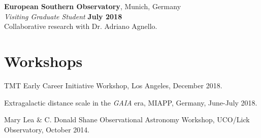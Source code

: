 \documentclass[margin, line]{res}
\newenvironment{list2}{
  \begin{list}{$\bullet$}{%
      \setlength{\itemsep}{0in}
      \setlength{\parsep}{0in} \setlength{\parskip}{0in}
      \setlength{\topsep}{0in} \setlength{\partopsep}{0in} 
      \setlength{\leftmargin}{0.2in}}}{\end{list}}
\begin{document}
\begin{resume}
{\bf European Southern Observatory}, Munich, Germany\\
{\em Visiting Graduate Student} \hfill {\bf July 2018}\\
Collaborative research with Dr. Adriano Agnello.







\section{\sc Workshops}
\begin{etaremune}
	\item TMT Early Career Initiative Workshop, Los Angeles, December 2018.
	\item Extragalactic distance scale in the \textit{GAIA} era, MIAPP, Germany, June-July 2018.
	\item Mary Lea \& C. Donald Shane Observational Astronomy Workshop, UCO/Lick Observatory, October 2014.
\end{etaremune}


%


\end{resume}
\end{document}
